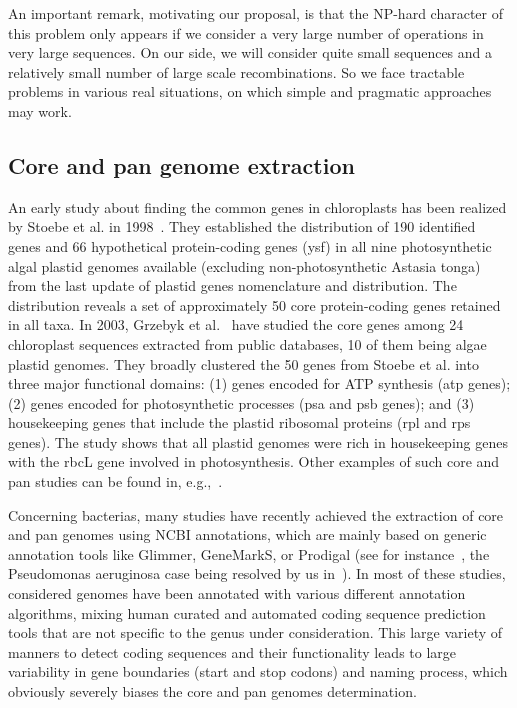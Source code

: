 \documentclass[runningheads,a4paper]{llncs}
\begin{document}
An important remark, motivating our proposal, is that the NP-hard character of this problem only appears if we consider a very large number of operations in very large sequences. On our side, we will consider quite small sequences and a relatively small number of large scale recombinations. So we face tractable problems in various real situations, on which simple and pragmatic approaches may work.

\subsection{Core and pan genome extraction}
An early study about finding the common genes in chloroplasts has been realized by Stoebe et al. in 1998~\cite{stoebe1998distribution}. They established the distribution of 190 identified genes and 66 hypothetical protein-coding genes (ysf) in all nine photosynthetic algal plastid genomes available (excluding non-photosynthetic Astasia tonga) from the last update of plastid genes nomenclature and distribution. The distribution reveals a set of approximately 50 core protein-coding genes retained in all taxa. In 2003, Grzebyk et al.~\cite{grzebyk2003mesozoic} have studied the core genes among 24 chloroplast sequences extracted from public databases, 10 of them being algae plastid genomes. They broadly clustered the 50 genes from Stoebe et al. into three major functional domains: (1) genes encoded for ATP synthesis (atp genes); (2) genes encoded for photosynthetic processes (psa and psb genes); and (3) housekeeping genes that include the plastid ribosomal proteins (rpl and rps genes). The study shows that all plastid genomes were rich in housekeeping genes with the rbcL gene involved in photosynthesis. Other examples of such core and pan studies can be found in, e.g.,~\cite{sharon2009photosystem,de2014genome,kurtz2004versatile}.

Concerning bacterias, many studies have recently achieved the extraction of core and pan genomes using NCBI annotations, which are mainly based on generic annotation tools like Glimmer, GeneMarkS, or Prodigal (see for instance~\cite{touchon2009organised,boissy2011comparative,tettelin2005genome}, the Pseudomonas aeruginosa case being resolved by us in~\cite{valot2015takes}). In most of these studies, considered genomes have been annotated with various different annotation algorithms, mixing human curated and automated coding sequence prediction tools that are not specific to the genus under consideration. This large variety of manners to detect coding sequences and their functionality leads to large variability in gene boundaries (start and stop codons) and naming process, which obviously severely biases the core and pan genomes determination.
\end{document}
